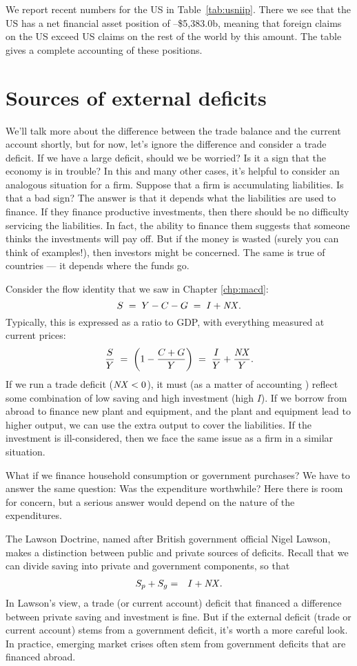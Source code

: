 We report recent numbers for the US in Table~\ref{tab:usniip}.
There we see that the US has a net financial asset position of
--\$5,383.0b, meaning that foreign claims on the US exceed US claims
on the rest of the world by this amount.
The table gives a complete accounting of these positions.


\section{Sources of external deficits}
We'll talk more about the difference between the trade balance and
the current account shortly,
but for now, let's ignore the difference and consider a trade deficit.
If we have a large deficit, should we be worried?
Is it a sign that the economy is in trouble?
In this and many other cases, it's helpful to consider an analogous situation
for a firm.
Suppose that a firm is accumulating liabilities.
Is that a bad sign?
The answer is that it depends what the liabilities are used to finance.
If they finance productive investments,
then there should be no difficulty servicing the liabilities.
In fact, the ability to finance them suggests that someone
thinks the investments will pay off.
But if the money is wasted (surely you can think of examples!),
then investors might be concerned.
The same is true of countries --- it depends where the funds go.

Consider the flow identity that we saw in Chapter \ref{chp:macd}:
\[
    S  \;=\; Y - C - G \;=\; I + \mbox{\em NX\/}.
\]
Typically, this is expressed as a ratio to GDP,
with everything measured at current prices:
\[
    \frac{S}{Y}  \;=\; \left( 1 - \frac{C+G}{Y} \right)
        \;=\; \frac{I}{Y} + \frac{\mbox{\em NX\/}}{Y}.
\]
If we run a trade deficit ($\mbox{\em NX\/} < 0$),
it must (as a matter of accounting )
reflect some combination of low saving
and high investment (high $I$).
If we borrow from abroad to
finance new plant and equipment, and the plant and equipment lead to
higher output, we can use the extra output to cover the liabilities.
If the investment is ill-considered, then we face the same issue
as a firm in a similar situation.

What if we finance household consumption
or government purchases?
We have to answer the same question:  Was the
expenditure worthwhile?  Here there is room for concern,
but a serious answer would depend on the nature of the expenditures.

The Lawson Doctrine, named after British government official Nigel Lawson,
makes a distinction between public and private sources of deficits.
Recall that we can divide saving into private  and government components,
so that
\begin{eqnarray*}
    S_p + S_g  &=& I + \mbox{\em NX\/}.
\end{eqnarray*}
In Lawson's view, a trade (or current account) deficit that financed
a difference between private saving and investment
is fine.
But if the external deficit (trade or current account)
stems from a government deficit,
it's worth a more careful look.
In practice, emerging market crises often stem from government
deficits that are financed abroad.


